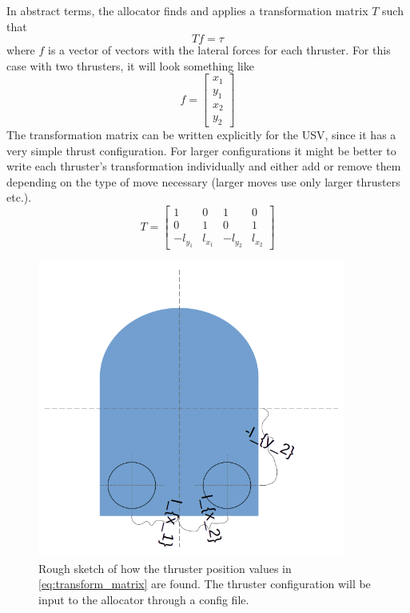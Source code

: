 \documentclass[class=article, crop=false]{standalone}
\begin{document}
In abstract terms, the allocator finds and applies a transformation matrix \(T\) such that \[Tf = \tau\] where \(f\) is a vector of vectors with the lateral forces for each thruster. For this case with two thrusters, it will look something like \[f = \begin{bmatrix}x_1 \\ y_1 \\ x_2 \\ y_2 \end{bmatrix}\]
The transformation matrix can be written explicitly for the USV, since it has a very simple thrust configuration. For larger configurations it might be better to write each thruster's transformation individually and either add or remove them depending on the type of move necessary (larger moves use only larger thrusters etc.).
\begin{equation}\label{eq:transform_matrix}
T = \begin{bmatrix}1 & 0 & 1 & 0 \\ 0 & 1 & 0 & 1 \\ -l_{y_1} & l_{x_1} & -l_{y_2} & l_{x_2}\end{bmatrix}
\end{equation}

\begin{figure}
    \centering
    \includegraphics[width=0.9\textwidth]{thruster_position_sketch}
    \caption{Rough sketch of how the thruster position values in \cref{eq:transform_matrix} are found. The thruster configuration will be input to the allocator through a config file.}
    \label{fig:thruster_position_sketch}
\end{figure}
\end{document}
